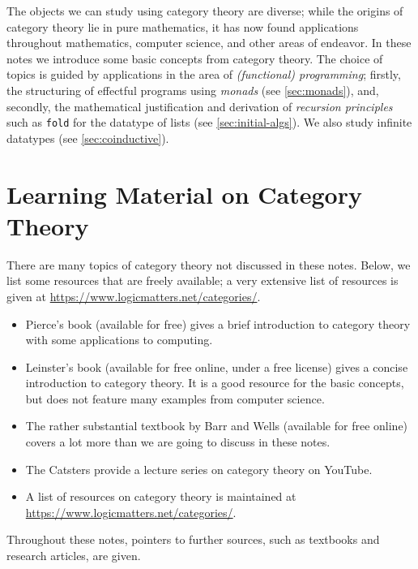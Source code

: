 \documentclass[a4paper,11pt, oneside,titlepage=false]{scrbook}
\theoremstyle{plain}
\theoremstyle{definition}
\begin{document}
The objects we can study using category theory are diverse;
while the origins of category theory lie in pure mathematics, it has now found applications throughout mathematics, computer science, and other areas of endeavor.
In these notes we introduce some basic concepts from category theory.
The choice of topics is guided by applications in the area of \emph{(functional) programming}; firstly, the structuring of effectful programs using \emph{monads} (see \cref{sec:monads}), and, secondly, the mathematical justification and derivation of \emph{recursion principles} such as \verb!fold! for the datatype of lists (see \cref{sec:initial-algs}).
We also study infinite datatypes (see \cref{sec:coinductive}).


\section{Learning Material on Category Theory}
\label{sec:material}


There are many topics of category theory not discussed in these notes.
Below, we list some resources that are freely available;
a very extensive list of resources is given at \url{https://www.logicmatters.net/categories/}.

\begin{itemize}
\item Pierce's book \cite{pierce} (available for free) gives a brief introduction to category theory with some applications to computing.

\item Leinster's book \cite{leinster} (available for free online, under a free license) gives a concise introduction to category theory.
It is a good resource for the basic concepts, but does not feature many examples from computer science.

\item The rather substantial textbook by Barr and Wells \cite{barr-wells} (available for free online) covers a lot more than we are going to discuss in these notes.

\item The Catsters \cite{catsters} provide a lecture series on category theory on YouTube.
  
\item A list of resources on category theory is maintained at \url{https://www.logicmatters.net/categories/}.
\end{itemize}

Throughout these notes, pointers to further sources, such as textbooks and research articles, are given.
\end{document}
